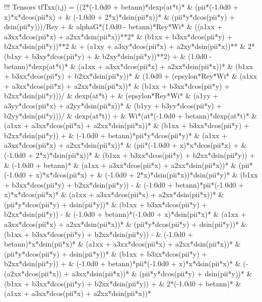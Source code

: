 \begin{fortrancode}[caption={Termos fontes}, label={cod:fortran-diffeq_2}]
       !!! Tensors
       tfTxx(i,j) =  ((2*(-1.0d0 + betann)*dexp(at*t)*
     &    (pii*(-1.0d0 + x)*x*dcos(pii*x) + 
     &      (-1.0d0 + 2*x)*dsin(pii*x))*
     &    (pii*y*dcos(pii*y) + dsin(pii*y)))/Rey + 
     & alphaG*(1.0d0 - betann)*Rey*Wi*
     &  ((a1xx + a3xx*dcos(pii*x) + a2xx*dsin(pii*x))**2*
     &     (b1xx + b3xx*dcos(pii*y) + b2xx*dsin(pii*y))**2
     &     + (a1xy + a3xy*dcos(pii*x) + a2xy*dsin(pii*x))**
     &      2*(b1xy + b3xy*dcos(pii*y) + 
     &        b2xy*dsin(pii*y))**2) + 
     & (1.0d0 - betann)*dexp(at*t)*
     &  (a1xx + a3xx*dcos(pii*x) + a2xx*dsin(pii*x))*
     &  (b1xx + b3xx*dcos(pii*y) + b2xx*dsin(pii*y))*
     &  (1.0d0 + (epsylon*Rey*Wi*
     &       (a1xx + a3xx*dcos(pii*x) + a2xx*dsin(pii*x))*
     &       (b1xx + b3xx*dcos(pii*y) + b2xx*dsin(pii*y)))/
     &     dexp(at*t) + 
     &    (epsylon*Rey*Wi*
     &       (a1yy + a3yy*dcos(pii*x) + a2yy*dsin(pii*x))*
     &       (b1yy + b3yy*dcos(pii*y) + b2yy*dsin(pii*y)))/
     &     dexp(at*t)) + 
     & Wi*(at*(-1.0d0 + betann)*dexp(at*t)*
     &     (a1xx + a3xx*dcos(pii*x) + a2xx*dsin(pii*x))*
     &     (b1xx + b3xx*dcos(pii*y) + b2xx*dsin(pii*y)) + 
     &    (-1.0d0 + betann)*pii*y*dcos(pii*y)*
     &     (a1xx + a3xx*dcos(pii*x) + a2xx*dsin(pii*x))*
     &     (pii*(-1.0d0 + x)*x*dcos(pii*x) + 
     &       (-1.0d0 + 2*x)*dsin(pii*x))*
     &     (b1xx + b3xx*dcos(pii*y) + b2xx*dsin(pii*y)) + 
     &    (-1.0d0 + betann)*
     &     (a1xx + a3xx*dcos(pii*x) + a2xx*dsin(pii*x))*
     &     (pii*(-1.0d0 + x)*x*dcos(pii*x) + 
     &       (-1.0d0 + 2*x)*dsin(pii*x))*dsin(pii*y)*
     &     (b1xx + b3xx*dcos(pii*y) + b2xx*dsin(pii*y)) - 
     &    (-1.0d0 + betann)*pii*(-1.0d0 + x)*x*dcos(pii*x)*
     &     (a1xx + a3xx*dcos(pii*x) + a2xx*dsin(pii*x))*
     &     (pii*y*dcos(pii*y) + dsin(pii*y))*
     &     (b1xx + b3xx*dcos(pii*y) + b2xx*dsin(pii*y)) - 
     &    (-1.0d0 + betann)*(-1.0d0 + x)*dsin(pii*x)*
     &     (a1xx + a3xx*dcos(pii*x) + a2xx*dsin(pii*x))*
     &     (pii*y*dcos(pii*y) + dsin(pii*y))*
     &     (b1xx + b3xx*dcos(pii*y) + b2xx*dsin(pii*y)) - 
     &    (-1.0d0 + betann)*x*dsin(pii*x)*
     &     (a1xx + a3xx*dcos(pii*x) + a2xx*dsin(pii*x))*
     &     (pii*y*dcos(pii*y) + dsin(pii*y))*
     &     (b1xx + b3xx*dcos(pii*y) + b2xx*dsin(pii*y)) + 
     &    (-1.0d0 + betann)*pii*(-1.0d0 + x)*x*dsin(pii*x)*
     &     (-(a2xx*dcos(pii*x)) + a3xx*dsin(pii*x))*
     &     (pii*y*dcos(pii*y) + dsin(pii*y))*
     &     (b1xx + b3xx*dcos(pii*y) + b2xx*dsin(pii*y)) + 
     &    2*(-1.0d0 + betann)*
     &     (a1xx + a3xx*dcos(pii*x) + a2xx*dsin(pii*x))*

\end{fortrancode}
